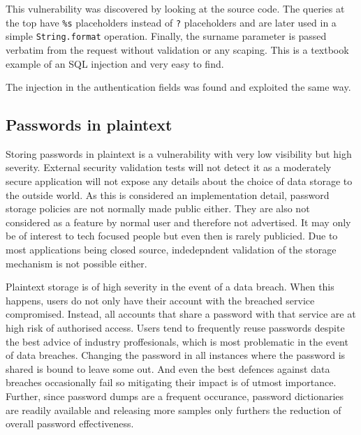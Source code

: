 \documentclass[10pt]{article}
\begin{document}
            This vulnerability was discovered by looking at the source code.
            The queries at the top have \texttt{\%s} placeholders instead of
            \texttt{?} placeholders and are later used in a simple
            \texttt{String.format} operation. Finally, the surname parameter is
            passed verbatim from the request without validation or any scaping.
            This is a textbook example of an SQL injection and very easy to
            find.

            The injection in the authentication fields was found and exploited
            the same way.

        \subsection{Passwords in plaintext}

            Storing passwords in plaintext is a vulnerability with very low
            visibility but high severity. External security validation tests
            will not detect it as a moderately secure application will not
            expose any details about the choice of data storage to the outside
            world. As this is considered an implementation detail, password
            storage policies are not normally made public either. They are also
            not considered as a feature by normal user and therefore not
            advertised. It may only be of interest to tech focused people but
            even then is rarely publicied. Due to most applications being
            closed source, indedepndent validation of the storage mechanism is
            not possible either.

            Plaintext storage is of high severity in the event of a data
            breach. When this happens, users do not only have their account
            with the breached service compromised. Instead, all accounts that
            share a password with that service are at high risk of authorised
            access. Users tend to frequently reuse passwords despite the best
            advice of industry proffesionals, which is most problematic in the
            event of data breaches. Changing the password in all instances
            where the password is shared is bound to leave some out. And even
            the best defences against data breaches occasionally fail so
            mitigating their impact is of utmost importance. Further, since
            password dumps are a frequent occurance, password dictionaries are
            readily available and releasing more samples only furthers the
            reduction of overall password effectiveness.
\end{document}
